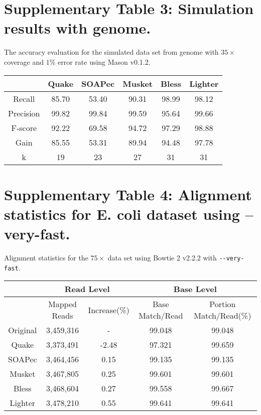 \documentclass[10pt]{article}
\begin{document}
\section*{Supplementary Table 3: Simulation results with \elegans genome.}

The accuracy evaluation for the simulated data set from \elegans genome with $35\times$ coverage and $1\%$ error rate using Mason \cite{holtgrewe2010mason} v0.1.2.

\begin{table}[h!]
\begin{tabular}{|c|c|c|c|c|c|} \hline
	&Quake	&SOAPec	&Musket	&Bless	&Lighter \\ \hline
Recall	&85.70	&53.40	&90.31	&98.99	&98.12 \\ \hline
Precision	&99.82	&99.84	&99.59	&95.64	&99.66 \\ \hline
F-score	&92.22	&69.58	&94.72	&97.29	&98.88 \\ \hline
Gain	&85.55	&53.31	&89.94	&94.48	&97.78 \\ \hline
k	    & 19	&	23 &	27 &	31 & 31 \\ \hline
\end{tabular}
\end{table}
\clearpage

\section*{Supplementary Table 4: Alignment statistics for E. coli dataset using --very-fast.}

Alignment statistics for the $75\times$ \ecoli data set using Bowtie 2 \cite{langmead2012fast} v2.2.2 with \verb+--very-fast+.

\begin{table}[h!] 
\begin{tabular}{|c|c|c||c|c|} \hline
	 & \multicolumn{2}{|c||}{Read Level} & \multicolumn{2}{|c|}{Base Level} \\ \hline
     & Mapped Reads & Increase(\%) & Base Match/Read & Portion Match/Read(\%) \\ \hline
Original&	3,459,316&	-&	99.048&	99.048  \\ \hline 
Quake&	3,373,491&	-2.48&	97.321&	99.659  \\ \hline
SOAPec&	3,464,456&	0.15&	99.135&	99.135 \\ \hline
Musket&	3,467,805&	0.25&	99.601&	99.601  \\ \hline
Bless&	3,468,604&	0.27&	99.558&	99.667	 \\ \hline
Lighter&	3,478,210&	0.55&	99.641&	99.641  \\ \hline
\end{tabular}
\end{table}
\clearpage
\end{document}
